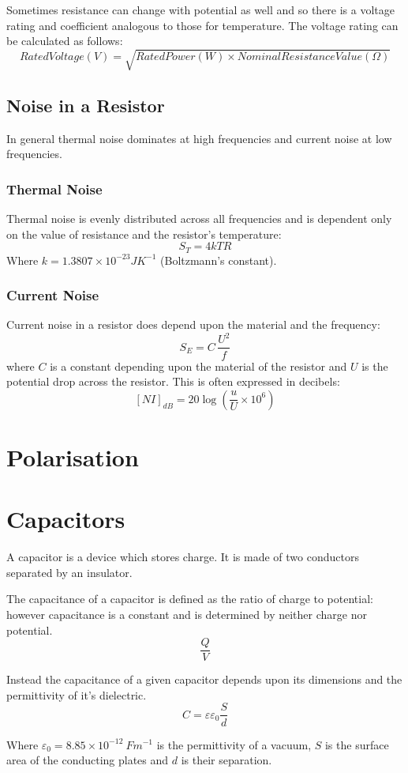 \documentclass[11pt,a4paper]{report}
\begin{document}
Sometimes resistance can change with potential as well and so there is a voltage rating and coefficient analogous to those for temperature. The voltage rating can be calculated as follows:
\[Rated Voltage(V)=\sqrt{Rated Power(W) \times Nominal Resistance Value(\Omega)}\]

\subsection{Noise in a Resistor}
In general thermal noise dominates at high frequencies and current noise at low frequencies.
\subsubsection{Thermal Noise}
Thermal noise is evenly distributed across all frequencies and is dependent only on the value of resistance and the resistor's temperature:
\[S_T = 4kTR\]
Where $k = 1.3807 \times 10^{-23} JK^{-1}$ (Boltzmann's constant). 

\subsubsection{Current Noise}
Current noise in a resistor does depend upon the material and the frequency:
\[S_E = C \, \frac{U^2}{f}\] where $C$ is a constant depending upon the material of the resistor and $U$ is the potential drop across the resistor.
This is often expressed in decibels:
\[[NI]_{dB} = 20 \log \left( \frac{u}{U} \times 10^6 \right)\]

\section{Polarisation}

\section{Capacitors}
A capacitor is a device which stores charge. It is made of two conductors separated by an insulator.

The capacitance of a capacitor is defined as the ratio of charge to potential: however capacitance is a constant and is determined by neither charge nor potential.
\[\frac{Q}{V}\]

Instead the capacitance of a given capacitor depends upon its dimensions and the permittivity of it's dielectric.
\[C=\varepsilon \varepsilon_0 \frac{S}{d}\]

Where $\varepsilon_0 = 8.85 \times10^{-12} \: Fm^{-1}$ is the permittivity of a vacuum, $S$ is the surface area of the conducting plates and $d$ is their separation.
\end{document}
